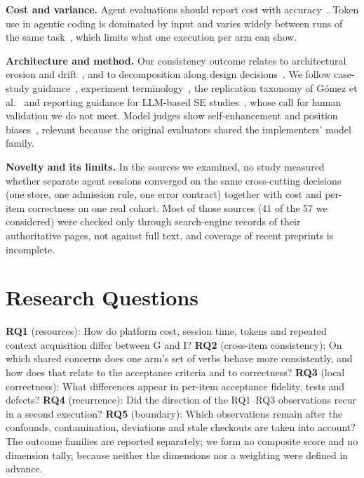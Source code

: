 \documentclass[10pt,conference]{IEEEtran}
\newcommand{\G}{G}
\newcommand{\I}{I}
\begin{document}
\textbf{Cost and variance.} Agent evaluations should report cost with accuracy~\cite{kapoor2025agents}. Token use in agentic coding is dominated by input and varies widely between runs of the same task~\cite{bai2026tokens}, which limits what one execution per arm can show.

\textbf{Architecture and method.} Our consistency outcome relates to architectural erosion and drift~\cite{perry1992foundations,li2022understanding}, and to decomposition along design decisions~\cite{parnas1972criteria}. We follow case-study guidance~\cite{runeson2009guidelines}, experiment terminology~\cite{wohlin2012experimentation}, the replication taxonomy of G\'omez et al.~\cite{gomez2014understanding} and reporting guidance for LLM-based SE studies~\cite{wagner2025towards,baltes2025guidelines,sallou2024breaking}, whose call for human validation we do not meet. Model judges show self-enhancement and position biases~\cite{zheng2023judging}, relevant because the original evaluators shared the implementers' model family.

\textbf{Novelty and its limits.} In the sources we examined, no study measured whether separate agent sessions converged on the same cross-cutting decisions (one store, one admission rule, one error contract) together with cost and per-item correctness on one real cohort. Most of those sources (41 of the 57 we considered) were checked only through search-engine records of their authoritative pages, not against full text, and coverage of recent preprints is incomplete. %

\section{Research Questions}\label{sec:rq}

\textbf{RQ1} (resources): How do platform cost, session time, tokens and repeated context acquisition differ between \G{} and \I?
\textbf{RQ2} (cross-item consistency): On which shared concerns does one arm's set of verbs behave more consistently, and how does that relate to the acceptance criteria and to correctness?
\textbf{RQ3} (local correctness): What differences appear in per-item acceptance fidelity, tests and defects?
\textbf{RQ4} (recurrence): Did the direction of the RQ1--RQ3 observations recur in a second execution?
\textbf{RQ5} (boundary): Which observations remain after the confounds, contamination, deviations and stale checkouts are taken into account?
The outcome families are reported separately; we form no composite score and no dimension tally, because neither the dimensions nor a weighting were defined in advance.
\end{document}
